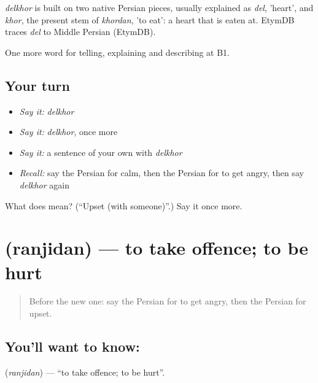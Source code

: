 \begin{cousinweb}
\emph{delkhor} is built on two native Persian pieces, usually explained as \emph{del}, 'heart', and \emph{khor}, the present stem of \emph{khordan}, 'to eat': a heart that is eaten at. EtymDB traces \emph{del} to Middle Persian (EtymDB).
\end{cousinweb}

\begin{grammarlens}[title={What you've built}]
One more word for telling, explaining and describing at B1.
\end{grammarlens}

\subsection*{Your turn}
\begin{itemize}
\raggedright
  \item \emph{Say it:} \emph{delkhor}
  \item \emph{Say it:} \emph{delkhor}, once more
  \item \emph{Say it:} a sentence of your own with \emph{delkhor}
  \item \emph{Recall:} say the Persian for calm, then the Persian for to get angry, then say \emph{delkhor} again
\end{itemize}

\begin{tcolorbox}[breakable,colback=teal!4,colframe=teal!35!black,title={Before you move on}]
What does  mean? (\textquotedblleft{}Upset (with someone)\textquotedblright{}.) Say it once more.
\end{tcolorbox}
\section[\texorpdfstring{\fa{رنجیدن} (ranjidan)}{رنجیدن (ranjidan)}]{ (ranjidan) — to take offence; to be hurt}

\label{lesson:FA-C482-ranjidan}



\begin{quote}
Before the new one: say the Persian for to get angry, then the Persian for upset.
\end{quote}

\subsection*{You'll want to know: }
\textbf{} (\emph{ranjidan}) — \textquotedblleft{}to take offence; to be hurt\textquotedblright{}.

